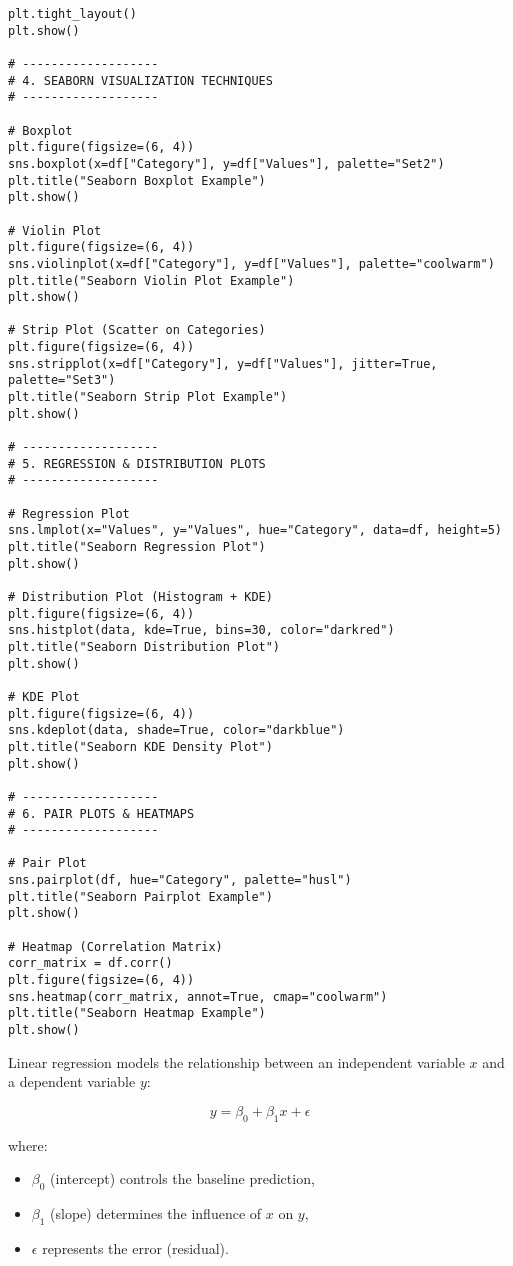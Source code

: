 \begin{verbatim}
plt.tight_layout()
plt.show()

# -------------------
# 4. SEABORN VISUALIZATION TECHNIQUES
# -------------------

# Boxplot
plt.figure(figsize=(6, 4))
sns.boxplot(x=df["Category"], y=df["Values"], palette="Set2")
plt.title("Seaborn Boxplot Example")
plt.show()

# Violin Plot
plt.figure(figsize=(6, 4))
sns.violinplot(x=df["Category"], y=df["Values"], palette="coolwarm")
plt.title("Seaborn Violin Plot Example")
plt.show()

# Strip Plot (Scatter on Categories)
plt.figure(figsize=(6, 4))
sns.stripplot(x=df["Category"], y=df["Values"], jitter=True, palette="Set3")
plt.title("Seaborn Strip Plot Example")
plt.show()

# -------------------
# 5. REGRESSION & DISTRIBUTION PLOTS
# -------------------

# Regression Plot
sns.lmplot(x="Values", y="Values", hue="Category", data=df, height=5)
plt.title("Seaborn Regression Plot")
plt.show()

# Distribution Plot (Histogram + KDE)
plt.figure(figsize=(6, 4))
sns.histplot(data, kde=True, bins=30, color="darkred")
plt.title("Seaborn Distribution Plot")
plt.show()

# KDE Plot
plt.figure(figsize=(6, 4))
sns.kdeplot(data, shade=True, color="darkblue")
plt.title("Seaborn KDE Density Plot")
plt.show()

# -------------------
# 6. PAIR PLOTS & HEATMAPS
# -------------------

# Pair Plot
sns.pairplot(df, hue="Category", palette="husl")
plt.title("Seaborn Pairplot Example")
plt.show()

# Heatmap (Correlation Matrix)
corr_matrix = df.corr()
plt.figure(figsize=(6, 4))
sns.heatmap(corr_matrix, annot=True, cmap="coolwarm")
plt.title("Seaborn Heatmap Example")
plt.show()
\end{verbatim}

Linear regression models the relationship between an independent variable \( x \) and a dependent variable \( y \):

\[
y = \beta_0 + \beta_1 x + \epsilon
\]

where:
\begin{itemize}
    \item \( \beta_0 \) (intercept) controls the baseline prediction,
    \item \( \beta_1 \) (slope) determines the influence of \( x \) on \( y \),
    \item \( \epsilon \) represents the error (residual).
\end{itemize}

